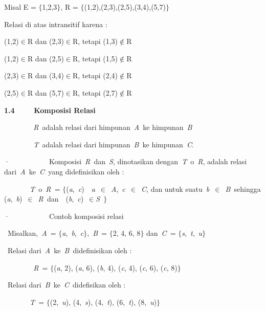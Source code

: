 \documentclass[11pt,fleqn]{book} %
\begin{document}
\noindent 

\noindent Misal E = $\{$1,2,3$\}$, R = $\{$(1,2),(2,3),(2,5),(3,4),(5,7)$\}$

\noindent Relasi di atas intransitif karena :

\noindent (1,2)$\mathrm{\in }$R dan (2,3)$\mathrm{\in }$R, tetapi (1,3)$\mathrm{\notin }$R

\noindent (1,2)$\mathrm{\in }$R dan (2,5)$\mathrm{\in }$R, tetapi (1,5)$\mathrm{\notin }$R

\noindent (2,3)$\mathrm{\in }$R dan (3,4)$\mathrm{\in }$R, tetapi (2,4)$\mathrm{\notin }$R

\noindent (2,5)$\mathrm{\in }$R dan (5,7)$\mathrm{\in }$R, tetapi (2,7)$\mathrm{\notin }$R

\noindent \textbf{1.4 ~~~~Komposisi Relasi}

\noindent 

\noindent \textit{~~~~~~~~R~}adalah relasi dari himpunan~\textit{A~}ke himpunan~\textit{B}

\noindent \textit{~~~~~~~~T~}adalah relasi dari himpunan~\textit{B~}ke himpunan~\textit{C}.

\noindent ·~~~~~~~~~~~Komposisi~\textit{R~}dan~\textit{S}, dinotasikan dengan~\textit{T~}$\mathrm{o}$~\textit{R}, adalah relasi dari~\textit{A~}ke~\textit{C~}yang didefinisikan oleh :

\noindent \textit{~~~~~~~T~}$\mathrm{o}$~\textit{R~}= $\{$(\textit{a},~\textit{c})~{\textbar}~\textit{a~}$\mathrm{\in }$~\textit{A},~\textit{c~}$\mathrm{\in }$~\textit{C}, dan untuk suatu~\textit{b~}$\mathrm{\in }$~\textit{B~}sehingga (\textit{a},~\textit{b})~$\mathrm{\in }$~\textit{R~}dan~~(\textit{b},~\textit{c})~$\mathrm{\in }$\textit{S~}$\}$

\noindent ·~~~~~~~~~~~Contoh komposisi relasi

\noindent {\O}~Misalkan,~\textit{A~}= $\{$\textit{a},~\textit{b},~\textit{c}$\}$,~\textit{B~}= $\{$2, 4, 6, 8$\}$ dan~\textit{C~}= $\{$\textit{s},~\textit{t},~\textit{u}$\}$

\noindent {\O}~Relasi dari~\textit{A~}ke~\textit{B~}didefinisikan oleh :

\noindent \textit{~~~~~~~~R~}= $\{$(\textit{a}, 2), (\textit{a}, 6), (\textit{b}, 4), (\textit{c}, 4), (\textit{c}, 6), (\textit{c}, 8)$\}$

\noindent {\O}~Relasi dari~\textit{B~}ke~\textit{C~}didefisikan oleh :

\noindent \textit{~~~~~~~T~}= $\{$(2,~\textit{u}), (4,~\textit{s}), (4,~\textit{t}), (6,~\textit{t}), (8,~\textit{u})$\}$
\end{document}
